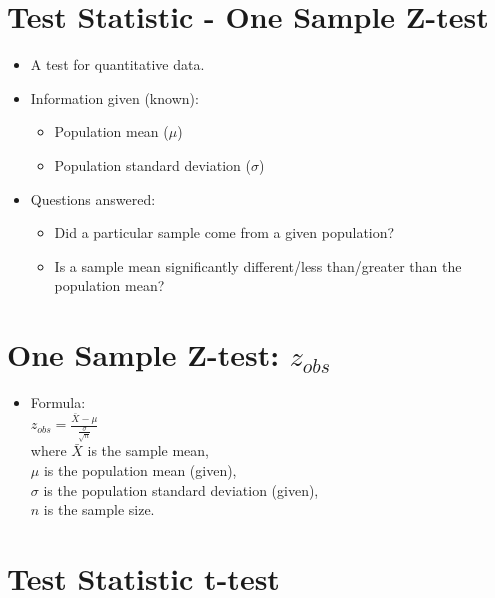\documentclass[12pt]{article}
\begin{document}
\section{Test Statistic - One Sample
Z-test}\label{test-statistic---one-sample-z-test}

\begin{itemize}
\itemsep1pt\parskip0pt
\item
  A test for quantitative data.
\item
  Information given (known):

  \begin{itemize}
  \itemsep1pt\parskip0pt
  \item
    Population mean (\(\mu\))
  \item
    Population standard deviation (\(\sigma\))
  \end{itemize}
\item
  Questions answered:

  \begin{itemize}
  \itemsep1pt\parskip0pt
  \item
    Did a particular sample come from a given population?
  \item
    Is a sample mean significantly different/less than/greater than the
    population mean?
  \end{itemize}
\end{itemize}

\section{\texorpdfstring{One Sample Z-test:
\(z_{obs}\)}{One Sample Z-test: z\_\{obs\}}}\label{one-sample-z-test-zux5fobs}

\begin{itemize}
\itemsep1pt\parskip0pt
\item
  Formula:\\\(z_{obs} = \frac{\bar{X} - \mu}{\frac{\sigma}{\sqrt{n}}}\)\\where
  \(\bar{X}\) is the sample mean,\\\(\mu\) is the population mean
  (given),\\\(\sigma\) is the population standard deviation
  (given),\\\(n\) is the sample size.
\end{itemize}

\section{Test Statistic t-test}\label{test-statistic-t-test}
\end{document}
